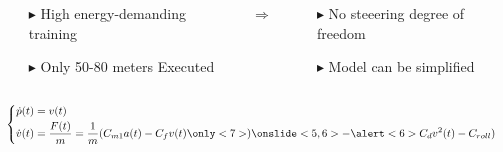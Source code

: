 \documentclass[9pt, aspectratio=169]{beamer}
\begin{document}
\begin{frame}[t]
\begin{columns}
\begin{column}{0.4\textwidth}
 \begin{block}{}
\centering
{} \begin{itemize}
 	 \footnotesize
	\item[$\blacktriangleright$] High energy-demanding training
	\item[$\blacktriangleright$] Only 50-80 meters Executed
\end{itemize}
\end{block}
\end{column}
\begin{column}{0.05\textwidth}
\centering
{} $\Rightarrow$
\end{column}
\begin{column}{0.35\textwidth}
\begin{block}{}
\centering
{} \begin{itemize}
 	 \footnotesize 
	\item[$\blacktriangleright$] No steeering degree of freedom 
	\item[$\blacktriangleright$] Model can be simplified
\end{itemize}
\end{block}
\end{column}
\end{columns}

\vspace{0.6cm}

\begin{columns}
\hspace{0.8cm}
\begin{column}{0.4\textwidth}
\vspace{-0.9cm}
\begin{equation*}
	\begin{cases}
 	\begin{aligned}
		\dot{p}(t) &= v(t) \\
		\dot{v}(t) &= \frac{F(t)}{m} = \frac{1}{m} (C_{m1} a(t) - C_f v(t) \only<7>) \onslide<5,6>{- \alert<6>{C_d v^2(t) - C_{roll}})}
	\end{aligned}
	\end{cases}
\end{equation*}
\end{column}


\end{columns}
\end{frame}
\end{document}

